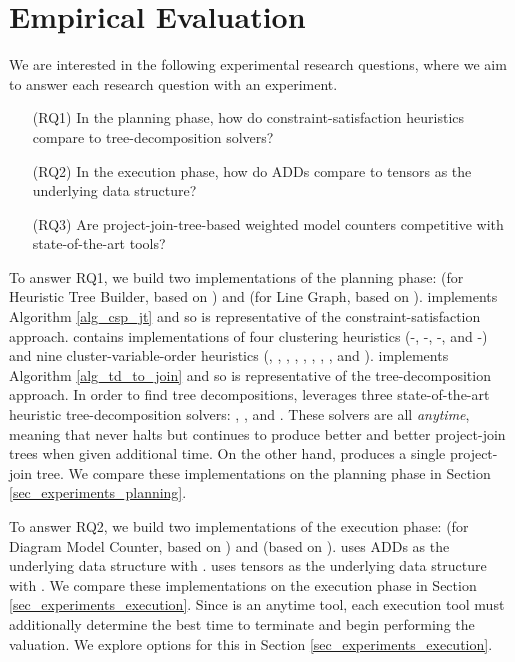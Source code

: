 \section{Empirical Evaluation}
\label{sec_experiments}

We are interested in the following experimental research questions, where we aim to answer each research question with an experiment.
\begin{itemize}
    \item[(RQ1)] In the planning phase, how do constraint-satisfaction heuristics compare to tree-decomposition solvers?
    \item[(RQ2)] In the execution phase, how do ADDs compare to tensors as the underlying data structure?
    \item[(RQ3)] Are project-join-tree-based weighted model counters competitive with state-of-the-art tools?
\end{itemize}

To answer RQ1, we build two implementations of the planning phase: \Htb{} (for Heuristic Tree Builder, based on \cite{dudek2020addmc}) and \Lg{} (for Line Graph, based on \cite{dudek2019efficient}).
\Htb{} implements Algorithm \ref{alg_csp_jt} and so is representative of the constraint-satisfaction approach.
\Htb{} contains implementations of four clustering heuristics (\Be-\ListH, \Be-\TreeH, \Bm-\ListH, and \Bm-\TreeH) and nine cluster-variable-order heuristics (\Random, \Mcs, \Invmcs, \Lexp, \Invlexp, \Lexm, \Invlexm, \Minfill, and \Invminfill).
\Lg{} implements Algorithm \ref{alg_td_to_join} and so is representative of the tree-decomposition approach.
In order to find tree decompositions, \Lg{} leverages three state-of-the-art heuristic tree-decomposition solvers: \Flowcutter{} \cite{strasser2017computing}, \Htd{} \cite{abseher2017htd}, and \Tamaki{} \cite{tamaki2019positive}.
These solvers are all \emph{anytime}, meaning that \Lg{} never halts but continues to produce better and better project-join trees when given additional time.
On the other hand, \Htb{} produces a single project-join tree.
We compare these implementations on the planning phase in Section \ref{sec_experiments_planning}.

To answer RQ2, we build two implementations of the execution phase: \Dmc{} (for Diagram Model Counter, based on \cite{dudek2020addmc}) and \Tensor{} (based on \cite{dudek2019efficient}).
\Dmc{} uses ADDs as the underlying data structure with \cudd{} \cite{somenzi2015cudd}.
\Tensor{} uses tensors as the underlying data structure with \Numpy{} \cite{numpy}.
We compare these implementations on the execution phase in Section \ref{sec_experiments_execution}.
Since \Lg{} is an anytime tool, each execution tool must additionally determine the best time to terminate \Lg{} and begin performing the valuation.
We explore options for this in Section \ref{sec_experiments_execution}.

